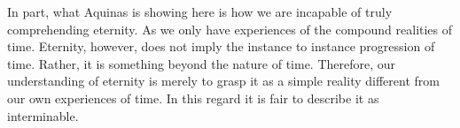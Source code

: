 \documentclass{ucetd}
\begin{document}
In part, what Aquinas is showing here is how we are incapable of truly comprehending eternity. As we only have experiences of the compound realities of time. Eternity, however, does not imply the instance to instance progression of time. Rather, it is something beyond the nature of time. Therefore, our understanding of eternity is merely to grasp it as a simple reality different from our own experiences of time. In this regard it is fair to describe it as interminable.
\end{document}
